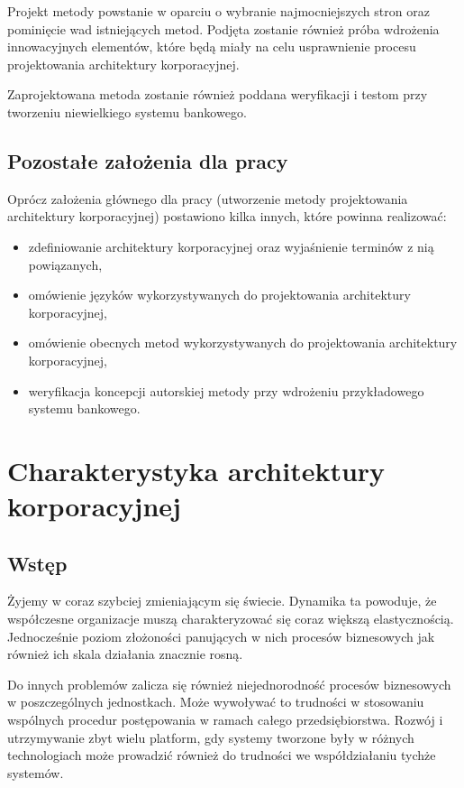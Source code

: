 Projekt metody powstanie w oparciu o wybranie najmocniejszych stron oraz pominięcie wad istniejących metod. Podjęta zostanie również próba wdrożenia innowacyjnych elementów, które będą miały na celu usprawnienie procesu projektowania architektury korporacyjnej.

Zaprojektowana metoda zostanie również poddana weryfikacji i testom przy tworzeniu niewielkiego systemu bankowego.

\section{Pozostałe założenia dla pracy}
Oprócz założenia głównego dla pracy (utworzenie metody projektowania architektury korporacyjnej) postawiono kilka innych, które powinna realizować:
\begin{itemize}
\item{zdefiniowanie architektury korporacyjnej oraz wyjaśnienie terminów z nią powiązanych,}
\item{omówienie języków wykorzystywanych do projektowania architektury korporacyjnej,}
\item{omówienie obecnych metod wykorzystywanych do projektowania architektury korporacyjnej,}
\item{weryfikacja koncepcji autorskiej metody przy wdrożeniu przykładowego systemu bankowego.}
\end{itemize}

\chapter{Charakterystyka architektury korporacyjnej}

\section{Wstęp}
Żyjemy w coraz szybciej zmieniającym się świecie. Dynamika ta powoduje, że współczesne organizacje muszą charakteryzować się coraz większą elastycznością. Jednocześnie poziom złożoności panujących w nich procesów biznesowych jak również ich skala działania znacznie rosną. \cite{SobArchKorpDobrPr}

Do innych problemów zalicza się również niejednorodność procesów biznesowych w poszczególnych jednostkach. Może wywoływać to trudności w stosowaniu wspólnych procedur postępowania w ramach całego przedsiębiorstwa. Rozwój i utrzymywanie zbyt wielu platform, gdy systemy tworzone były w różnych technologiach może prowadzić również do trudności we współdziałaniu tychże systemów.

